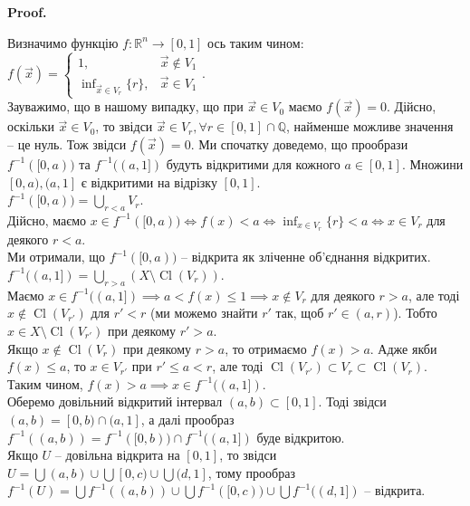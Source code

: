 \documentclass[a4paper, 10pt]{article}
\makeatletter
\def\qed{$\blacksquare$}
\theoremstyle{theoremdd}
\theoremstyle{theoremdd}
\theoremstyle{theoremdd}
\theoremstyle{theoremdd}
\theoremstyle{theoremdd}
\theoremstyle{theoremdd}
\theoremstyle{theoremdd}
\theoremstyle{theoremdd}
\theoremstyle{theoremdd}
\theoremstyle{theoremdd}
\theoremstyle{theoremdd}
\theoremstyle{theoremdd}
\theoremstyle{theoremdd}
\theoremstyle{theoremdd}
\theoremstyle{theoremdd}
\renewenvironment{proof}[1][Proof.\\]{\par
\pushQED{\hfill \qed}%
\normalfont \topsep6\p@\@plus6\p@\relax
\trivlist
\item\relax
{\bfseries
#1\@addpunct{.}}\hspace\labelsep\ignorespaces
}{%
\popQED\endtrivlist\@endpefalse
}
\DeclareMathOperator{\Cl}{Cl}
\makeatother
\begin{document}
\begin{proof}
Визначимо функцію $f \colon \mathbb{R}^n \to [0,1]$ ось таким чином: $f(\vec{x}) = \begin{cases} 1, & \vec{x} \notin V_1 \\ \inf_{\vec{x} \in V_r} \{r\}, & \vec{x} \in V_1 \end{cases}$. \\
Зауважимо, що в нашому випадку, що при $\vec{x} \in V_0$ маємо $f(\vec{x}) = 0$. Дійсно, оскільки $\vec{x} \in V_0$, то звідси $\vec{x} \in V_r, \forall r \in [0,1] \cap \mathbb{Q}$, найменше можливе значення -- це нуль. Тож звідси $f(\vec{x}) = 0$.
Ми спочатку доведемо, що прообрази $f^{-1}([0,a))$ та $f^{-1}((a,1])$ будуть відкритими для кожного $a \in [0,1]$. Множини $[0,a),(a,1]$ є відкритими на відрізку $[0,1]$.\\
$f^{-1}([0,a)) = \displaystyle\bigcup_{r < a} V_r$. \\
Дійсно, маємо $x \in f^{-1}([0,a)) \iff f(x) < a \iff \displaystyle\inf_{x \in V_r} \{r\} < a \iff x \in V_r$ для деякого $r < a$.\\
Ми отримали, що $f^{-1}([0,a))$ -- відкрита як зліченне об'єднання відкритих.\\
$f^{-1}((a,1]) = \displaystyle\bigcup_{r > a} (X \setminus \Cl(V_r))$.\\
Маємо $x \in f^{-1}((a,1]) \implies a < f(x) \leq 1 \implies x \notin V_r$ для деякого $r > a$, але тоді $x \notin \Cl(V_{r'})$ для $r' < r$ (ми можемо знайти $r'$ так, щоб $r' \in (a,r)$). Тобто $x \in X \setminus \Cl(V_{r'})$ при деякому $r' > a$.\\
Якщо $x \notin \Cl(V_r)$ при деякому $r > a$, то отримаємо $f(x) > a$. Адже якби $f(x) \leq a$, то $x \in V_{r'}$ при $r' \leq a < r$, але тоді $\Cl(V_{r'}) \subset V_r \subset \Cl(V_r)$. Таким чином, $f(x) > a \implies x \in f^{-1}((a,1])$.\\
Оберемо довільний відкритий інтервал $(a,b) \subset [0,1]$. Тоді звідси $(a,b) = [0,b) \cap (a,1]$, а далі прообраз $f^{-1}((a,b)) = f^{-1}([0,b)) \cap f^{-1}((a,1])$ буде відкритою.\\
Якщо $U$ -- довільна відкрита на $[0,1]$, то звідси $U = \displaystyle\bigcup (a,b) \cup \displaystyle\bigcup [0,c) \cup \displaystyle\bigcup (d,1]$, тому прообраз\\
$f^{-1}(U) = \displaystyle\bigcup f^{-1}((a,b)) \cup \bigcup f^{-1}([0,c)) \cup \bigcup f^{-1}((d,1])$ -- відкрита.
\end{proof}
\end{document}
